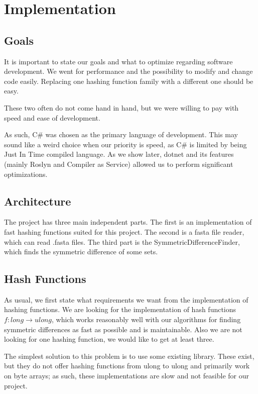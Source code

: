 \chapter{Implementation}

\section{Goals}
It is important to state our goals and what to optimize regarding software development. We went for performance and the possibility to modify and change code easily. Replacing one hashing function family with a different one should be easy.  

These two often do not come hand in hand, but we were willing to pay with speed and ease of development.

As such, C\# was chosen as the primary language of development. This may sound like a weird choice when our priority is speed, as C\# is limited by being Just In Time compiled language. As we show later, dotnet and its features (mainly Roslyn and Compiler as Service) allowed us to perform significant optimizations. 


\section{Architecture}
The project has three main independent parts. The first is an implementation of fast hashing functions suited for this project. The second is a fasta file reader, which can read .fasta files. The third part is the SymmetricDifferenceFinder, which finds the symmetric difference of some sets.

\section{}

\section{Hash Functions}

As usual, we first state what requirements we want from the implementation of hashing functions. We are looking for the implementation of hash functions $f: long \rightarrow ulong$, which works reasonably well with our algorithms for finding symmetric differences as fast as possible and is maintainable. Also we are not looking for one hashing function, we would like to get at least three.

The simplest solution to this problem is to use some existing library. These exist, but they do not offer hashing functions from ulong to ulong and primarily work on byte arrays; as such, these implementations are slow and not feasible for our project.

